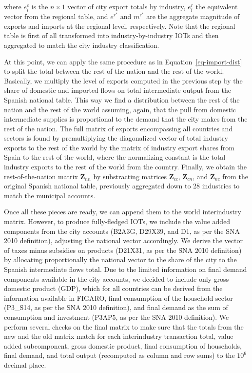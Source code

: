 \documentclass[
  10pt,
  twocolumn]{aft}
\begin{document}
where \(e^{c}_{i}\) is the \(n \times 1\) vector of city export totals
by industry, \(e^r_{i}\) the equivalent vector from the regional table,
and \(e^{r^\ast}\) and \(m^{r^\ast}\) are the aggregate magnitude of
exports and imports at the regional level, respectively. Note that the
regional table is first of all transformed into industry-by-industry
IOTs and then aggregated to match the city industry classification.

At this point, we can apply the same procedure as in
Equation~\ref{eq-import-dist} to split the total between the rest of the
nation and the rest of the world. Basically, we multiply the level of
exports computed in the previous step by the share of domestic and
imported flows on total intermediate output from the Spanish national
table. This way we find a distribution between the rest of the nation
and the rest of the world assuming, again, that the pull from domestic
intermediate supplies is proportional to the demand that the city makes
from the rest of the nation. The full matrix of exports encompassing all
countries and sectors is found by premultiplying the diagonalized vector
of total industry exports to the rest of the world by the matrix of
industry export shares from Spain to the rest of the world, where the
normalizing constant is the total industry exports to the rest of the
world from the country. Finally, we obtain the rest-of-the-nation matrix
\(\textbf{Z}_{nn}\) by substracting matrices \(\textbf{Z}_{cc}\),
\(\textbf{Z}_{cn}\), and \(\textbf{Z}_{nc}\) from the original Spanish
national table, previously aggregated down to 28 industries to match the
municipal accounts.

Once all these pieces are ready, we can append them to the world
interindustry matrix. However, to produce fully-fledged IOTs, we include
the value added components from the city accounts (B2A3G, D29X39, and
D1, as per the SNA 2010 definition), adjusting the national vector
accordingly. We derive the vector of taxes minus subsidies on products
(D21X31, as per the SNA 2010 definition) by allocating proportionally
the national vector to the share of the city to the Spanish intermediate
flows total. Due to the limited information on final demand components
available in the city accounts, we decided to include only gross
domestic product (GDP), which for all countries can be derived from the
information available in FIGARO, final consumption of the household
sector (P3\_S14, as per the SNA 2010 definition), and final demand as
the sum of consumption and investment (P3AP5, as per the SNA 2010
definition). We perform several checks on the final matrix to make sure
that the totals from the new and the old matrix match for each
interindustry transaction total, value added subcomponent, gross
domestic product, final consumption of households, final demand, and
total output (recomputed as column and row sums) to the \(10^6\) decimal
place.
\end{document}
